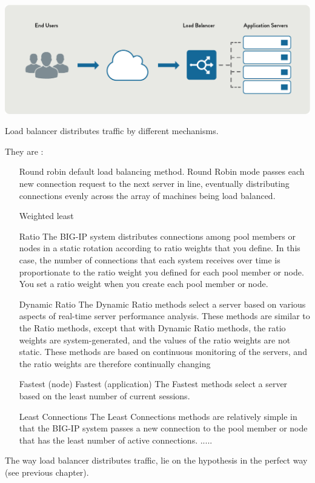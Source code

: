 \documentclass{report}
\begin{document}
\centering\includegraphics[scale=0.4]{images/application-delivery-load-balancing-diagram-simple-1.png}

Load balancer distributes traffic by different mechanisms. 


They are :
\begin{itemize}
\item[Round robin] default load balancing method. Round Robin mode passes each new connection request to the next server in line, eventually distributing connections evenly across the array of machines being load balanced.
\item[Weighted least]
\item[Ratio] The BIG-IP system distributes connections among pool members or nodes in a static rotation according to ratio weights that you define. In this case, the number of connections that each system receives over time is proportionate to the ratio weight you defined for each pool member or node. You set a ratio weight when you create each pool member or node.
\item[Dynamic Ratio] The Dynamic Ratio methods select a server based on various aspects of real-time server performance analysis. These methods are similar to the Ratio methods, except that with Dynamic Ratio methods, the ratio weights are system-generated, and the values of the ratio weights are not static. These methods are based on continuous monitoring of the servers, and the ratio weights are therefore continually changing
\item[Fastest (node) Fastest (application)] The Fastest methods select a server based on the least number of current sessions. 
\item[Least Connections ]The Least Connections methods are relatively simple in that the BIG-IP system passes a new connection to the pool member or node that has the least number of active connections.
.....
\end{itemize}


The way load balancer distributes traffic, lie on the hypothesis in the perfect way (see previous chapter).
\end{document}
